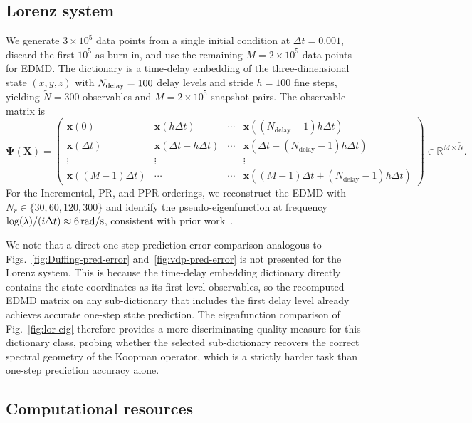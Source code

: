 \documentclass{article}
\theoremstyle{plain}
\theoremstyle{definition}
\def\R{\mathbb{R}}
\def\by{\times}
\newcommand{\arXivtag}[1][]{#1}
\begin{document}
\subsection{Lorenz system}\label{app:lorenz}

\arXivtag[We generate $3 \times 10^5$ data points from a single initial condition at $\Delta t = 0.001$, discard the first $10^5$ as burn-in, and use the remaining $M=2\times 10^5$ data points for EDMD.] The dictionary is a time-delay embedding of the three-dimensional state $(x,y,z)$ with $N_{\textnormal{delay}} = 100$ delay levels and stride $h = 100$ fine steps, yielding $\tilde{N} = 300$ observables and $M = 2 \times 10^5$ snapshot pairs. The observable matrix is 
$$
\mathbf{\Psi}(\mathbf{X}) = \begin{pmatrix}
	\mathbf{x}(0) & \mathbf{x}(h\Delta t) & \cdots & \mathbf{x}((N_{\text{delay}}\!-\!1)h \Delta t) \\
	\mathbf{x}(\Delta t) & \mathbf{x}(\Delta t + h\Delta t) & \cdots & \mathbf{x}(\Delta t + (N_{\text{delay}}\!-\!1)h \Delta t) \\
	\vdots & \vdots & & \vdots \\
	\mathbf{x}((M\!-\!1)\Delta t)& \cdots & \cdots & \mathbf{x}((M\!-\!1)\Delta t 
	+ (N_{\text{delay}}\!-\!1)h \Delta t)
\end{pmatrix} \in \R^{M \by \tilde{N}}.
$$
For the Incremental, PR, and PPR orderings, we reconstruct the EDMD with $N_r \in \{30, 60, 120, 300\}$ and identify the pseudo-eigenfunction at frequency $\log(\lambda)/(i\Delta t) \approx 6\,\textnormal{rad/s}$, consistent with prior work~\cite{arbabi2017ergodic, susuki2015prony, brunton2017chaos}. 

We note that a direct one-step prediction error comparison analogous to Figs.~\ref{fig:Duffing-pred-error} and~\ref{fig:vdp-pred-error} is not presented for the Lorenz system. This is because the time-delay embedding dictionary directly contains the state coordinates as its first-level observables, so the recomputed EDMD matrix on any sub-dictionary that includes the first delay level already achieves accurate one-step state prediction. The eigenfunction comparison of Fig.~\ref{fig:lor-eig} therefore provides a more discriminating quality measure for this dictionary class, probing whether the selected sub-dictionary recovers the correct spectral geometry of the Koopman operator, which is a strictly harder task than one-step prediction accuracy alone.

\subsection{Computational resources}\label{app:compute}
\end{document}
